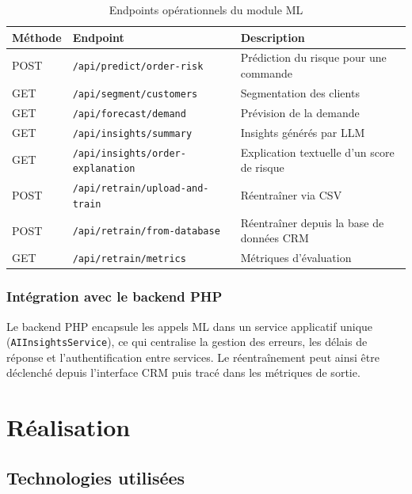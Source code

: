 \documentclass[12pt,a4paper]{report}
\begin{document}
\begin{table}[H]
\centering
\caption{Endpoints op\'{e}rationnels du module ML}
\label{tab:endpoints}
\begin{tabularx}{\textwidth}{l l X}
\toprule
\textbf{M\'{e}thode} & \textbf{Endpoint} & \textbf{Description} \\
\midrule
POST & \texttt{/api/predict/order-risk} & Pr\'{e}diction du risque pour une commande \\
GET & \texttt{/api/segment/customers} & Segmentation des clients \\
GET & \texttt{/api/forecast/demand} & Pr\'{e}vision de la demande \\
GET & \texttt{/api/insights/summary} & Insights g\'{e}n\'{e}r\'{e}s par LLM \\
GET & \texttt{/api/insights/order-explanation} & Explication textuelle d'un score de risque \\
POST & \texttt{/api/retrain/upload-and-train} & R\'{e}entra\^{i}ner via CSV \\
POST & \texttt{/api/retrain/from-database} & R\'{e}entra\^{i}ner depuis la base de donn\'{e}es CRM \\
GET & \texttt{/api/retrain/metrics} & M\'{e}triques d'\'{e}valuation \\
\bottomrule
\end{tabularx}
\end{table}

\subsection{Int\'{e}gration avec le backend PHP}

Le backend PHP encapsule les appels ML dans un service applicatif unique (\texttt{AIInsightsService}), ce qui centralise la gestion des erreurs, les d\'{e}lais de r\'{e}ponse et l'authentification entre services. Le r\'{e}entra\^{i}nement peut ainsi \^{e}tre d\'{e}clench\'{e} depuis l'interface CRM puis trac\'{e} dans les m\'{e}triques de sortie.


\chapter{R\'{e}alisation}

\section{Technologies utilis\'{e}es}
\end{document}
